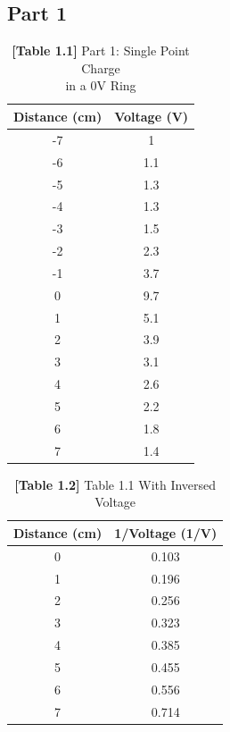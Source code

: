 \documentclass[titlepage]{article}
\begin{document}
	\subsection{Part 1}
	\begin{center}
	\hspace{1.7cm}
	\begin{paracol}{2}
		\begin{table}[h]
		\captionsetup{justification=centering}
		\centering
		\caption*{\textbf{[Table 1.1]} Part 1: Single Point Charge\\ in a 0V Ring\\}
		\begin{tabular}{c|c}
			\textbf{Distance (cm)} & \textbf{Voltage (V)}\\
			\hline
			-7 & 1\\
			-6 & 1.1\\
			-5 & 1.3\\
			-4 & 1.3\\
			-3 & 1.5\\
			-2 & 2.3\\
			-1 & 3.7\\
			0 & 9.7\\
			1 & 5.1\\
			2 & 3.9\\
			3 & 3.1\\
			4 & 2.6\\
			5 & 2.2\\
			6 & 1.8\\
			7 & 1.4\\

		\end{tabular}
		\end{table}
	\switchcolumn
	\begin{table}[h]
		\centering
	\caption*{\textbf{[Table 1.2]} Table 1.1 With Inversed Voltage}
		\vspace{0.35cm}
		\begin{tabular}{c|c}
			\textbf{Distance (cm)} & \textbf{1/Voltage (1/V)}\\
			\hline
			0 & 0.103\\
			1 & 0.196\\
			2 & 0.256\\
			3 & 0.323\\
			4 & 0.385\\
			5 & 0.455\\
			6 & 0.556\\
			7 & 0.714\\
		\end{tabular}
	\end{table}
\end{paracol}
\end{center}
\end{document}
